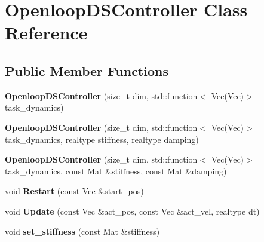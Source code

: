 \hypertarget{classOpenloopDSController}{\section{Openloop\+D\+S\+Controller Class Reference}
\label{classOpenloopDSController}
}
\subsection*{Public Member Functions}
\begin{DoxyCompactItemize}
\item 
\hypertarget{classOpenloopDSController_a7c98b3506a67b133cdc148e974a2ff56}{{\bfseries Openloop\+D\+S\+Controller} (size\+\_\+t dim, std\+::function$<$ Vec(Vec)$>$ task\+\_\+dynamics)}\label{classOpenloopDSController_a7c98b3506a67b133cdc148e974a2ff56}

\item 
\hypertarget{classOpenloopDSController_a50e5440134b967ba4937f00a0ed501c1}{{\bfseries Openloop\+D\+S\+Controller} (size\+\_\+t dim, std\+::function$<$ Vec(Vec)$>$ task\+\_\+dynamics, realtype stiffness, realtype damping)}\label{classOpenloopDSController_a50e5440134b967ba4937f00a0ed501c1}

\item 
\hypertarget{classOpenloopDSController_a87d0f11ee111106a5d5012a70e10ad63}{{\bfseries Openloop\+D\+S\+Controller} (size\+\_\+t dim, std\+::function$<$ Vec(Vec)$>$ task\+\_\+dynamics, const Mat \&stiffness, const Mat \&damping)}\label{classOpenloopDSController_a87d0f11ee111106a5d5012a70e10ad63}

\item 
\hypertarget{classOpenloopDSController_a25eff455fab9d4787429d7e5b22acb85}{void {\bfseries Restart} (const Vec \&start\+\_\+pos)}\label{classOpenloopDSController_a25eff455fab9d4787429d7e5b22acb85}

\item 
\hypertarget{classOpenloopDSController_aefb250b6967feba1db59587601a66d16}{void {\bfseries Update} (const Vec \&act\+\_\+pos, const Vec \&act\+\_\+vel, realtype dt)}\label{classOpenloopDSController_aefb250b6967feba1db59587601a66d16}

\item 
\hypertarget{classOpenloopDSController_ac04e119762fa54d1b24d524f17d6dcf3}{void {\bfseries set\+\_\+stiffness} (const Mat \&stiffness)}\label{classOpenloopDSController_ac04e119762fa54d1b24d524f17d6dcf3}


\end{DoxyCompactItemize}
